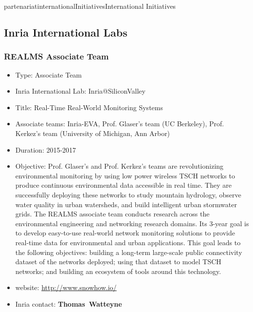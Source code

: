 \documentclass{ra2016}
\newcommand{\thomas}           {\textbf{Thomas~Watteyne}}
\begin{document}

\begin{module}{partenariat}{internationalInitiatives}{International Initiatives}


\subsection{Inria International Labs}


\subsubsection{REALMS Associate Team}
\label{sec:realms}

\begin{itemize}
    \item Type: Associate Team
    \item Inria International Lab: Inria@SiliconValley
    \item Title: Real-Time Real-World Monitoring Systems
    \item Associate teams: Inria-EVA, Prof. Glaser's team (UC Berkeley), Prof. Kerkez's team (University of Michigan, Ann Arbor)
    \item Duration: 2015-2017
    \item Objective:
        Prof. Glaser's and Prof. Kerkez's teams are revolutionizing environmental monitoring by using low power wireless TSCH networks to produce continuous environmental data accessible in real time.
        They are successfully deploying these networks to study mountain hydrology, observe water quality in urban watersheds, and build intelligent urban stormwater grids.
        The REALMS associate team conducts research across the environmental engineering and networking research domains.
        Its 3-year goal is to develop easy-to-use real-world network monitoring solutions to provide real-time data for environmental and urban applications.
        This goal leads to the following objectives: building a long-term large-scale public connectivity dataset of the networks deployed; using that dataset to model TSCH networks; and building an ecosystem of tools around this technology.
    \item website: \url{http://www.snowhow.io/}
    \item Inria contact: \thomas
\end{itemize}


\end{module}
\end{document}
